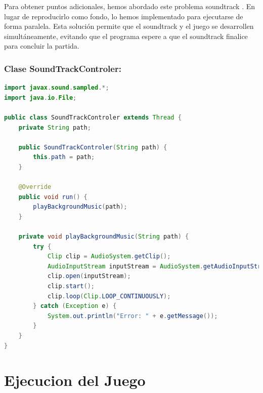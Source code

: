 \documentclass{article}
\begin{document}
Para obtener puntos adicionales, hemos abordado este problema soundtrack . En lugar de reproducirlo como fondo, lo hemos implementado para ejecutarse de forma paralela. Esta solución permite que el soundtrack y el juego se desarrollen simultáneamente, evitando que el programa espere a que el soundtrack finalice para concluir la partida.

\subsubsection{Clase SoundTrackControler:}
\begin{lstlisting}[language=java,caption={Clase SoundTrackControler}]
import javax.sound.sampled.*;
import java.io.File;

public class SoundTrackControler extends Thread {
    private String path;

    public SoundTrackControler(String path) {
        this.path = path;
    }

    @Override
    public void run() {
        playBackgroundMusic(path);
    }

    private void playBackgroundMusic(String path) {
        try {
            Clip clip = AudioSystem.getClip();
            AudioInputStream inputStream = AudioSystem.getAudioInputStream(new File(path));
            clip.open(inputStream);
            clip.start();
            clip.loop(Clip.LOOP_CONTINUOUSLY);
        } catch (Exception e) {
            System.out.println("Error: " + e.getMessage());
        }
    }
}
\end{lstlisting}

 \section{Ejecucion del Juego}
 
\end{document}
